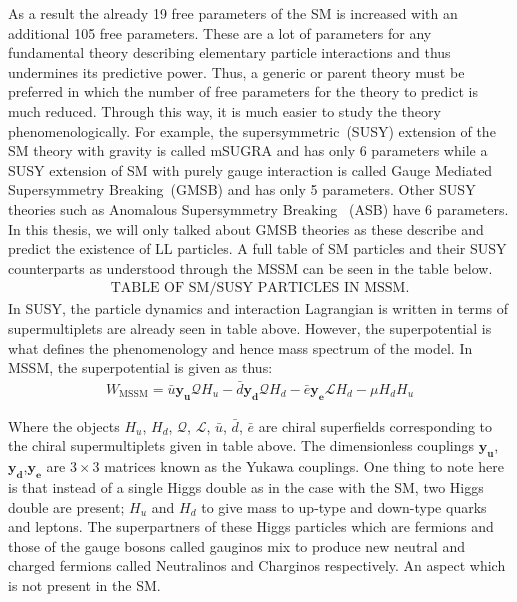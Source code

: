 As a result the already 19 free parameters of the SM is increased with an additional 105 free parameters. These are a lot of parameters for any fundamental theory describing elementary particle  interactions and thus undermines its predictive power. Thus, a generic or parent theory must be preferred in which the number of free parameters for the theory to predict is much reduced. Through this way, it is much easier to study the theory phenomenologically. For example, the supersymmetric~(SUSY) extension of the SM theory with gravity is called mSUGRA and has only 6 parameters while a SUSY extension of SM with purely gauge interaction is called Gauge Mediated Supersymmetry Breaking~(GMSB) and has only 5 parameters. Other SUSY theories such as Anomalous Supersymmetry Breaking ~(ASB) have 6 parameters.
\newline
In this thesis, we will only talked about GMSB theories as these describe and predict the existence of LL particles.
A full table of SM particles and their SUSY counterparts as understood through the MSSM can be seen in the table below.
\begin{align}
\mbox{TABLE OF SM/SUSY PARTICLES IN MSSM.}
\end{align}
In SUSY, the particle dynamics and interaction Lagrangian is written in terms of supermultiplets are already seen in table above.
However, the superpotential is what defines the phenomenology and hence mass spectrum of the model.
In MSSM, the superpotential is given as thus\cite{SUSYM}:
\begin{align}
W_{\mbox{MSSM}} = \bar{u}\mathbf{y_{u}}\mathcal{Q}H_{u}   -   \bar{d}\mathbf{y_{d}}\mathcal{Q}H_{d}   -  \bar{e}\mathbf{y_{e}}\mathcal{L}H_{d}  -  \mu H_{d}H_{u}
\end{align}

Where the objects $H_{u}$, $H_{d}$, $\mathcal{Q}$, $\mathcal{L}$, $\bar{u}$, $\bar{d}$, $\bar{e}$ are chiral superfields corresponding to the chiral supermultiplets given in table above.
The dimensionless couplings $\mathbf{y_{u}}$,$\mathbf{y_{d}}$,$\mathbf{y_{e}}$ are $3 \times 3$ matrices known as the Yukawa couplings. One thing to note here is that instead of a single Higgs double as in the case with the SM, two Higgs double are present; $H_{u}$ and $H_{d}$ to give mass to up-type and down-type quarks and leptons. The superpartners of these Higgs particles which are fermions and those of the gauge bosons called gauginos mix to produce new neutral and charged fermions called Neutralinos and Charginos respectively. An aspect which is not present in the SM.
